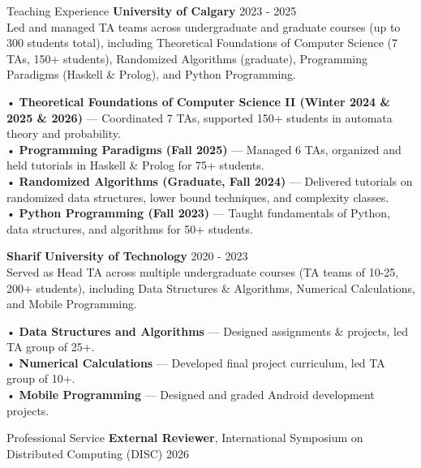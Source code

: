 \documentclass{resume} %
\begin{document}
\begin{rSection}{Teaching Experience}
\textbf{University of Calgary} \hfill 2023 - 2025 \\
Led and managed TA teams across undergraduate and graduate courses (up to 300 students total), including Theoretical Foundations of Computer Science (7 TAs, 150+ students), Randomized Algorithms (graduate), Programming Paradigms (Haskell \& Prolog), and Python Programming.

\noindent
• \textbf{Theoretical Foundations of Computer Science II (Winter 2024 \& 2025 \& 2026)} — Coordinated 7 TAs, supported 150+ students in automata theory and probability.\\
• \textbf{Programming Paradigms (Fall 2025)} — Managed 6 TAs, organized and held tutorials in Haskell \& Prolog for 75+ students.\\
• \textbf{Randomized Algorithms (Graduate, Fall 2024)} — Delivered tutorials on randomized data structures, lower bound techniques, and complexity classes.\\
• \textbf{Python Programming (Fall 2023)} — Taught fundamentals of Python, data structures, and algorithms for 50+ students.

\textbf{Sharif University of Technology} \hfill 2020 - 2023 \\
Served as Head TA across multiple undergraduate courses (TA teams of 10-25, 200+ students), including Data Structures \& Algorithms, Numerical Calculations, and Mobile Programming.

\noindent
• \textbf{Data Structures and Algorithms} — Designed assignments \& projects, led TA group of 25+.\\
• \textbf{Numerical Calculations} — Developed final project curriculum, led TA group of 10+.\\
• \textbf{Mobile Programming} — Designed and graded Android development projects.

\end{rSection}


\begin{rSection}{Professional Service}
{\bf External Reviewer}{, International Symposium on Distributed Computing (DISC)} \hfill{2026}
\end{rSection}

\end{document}
